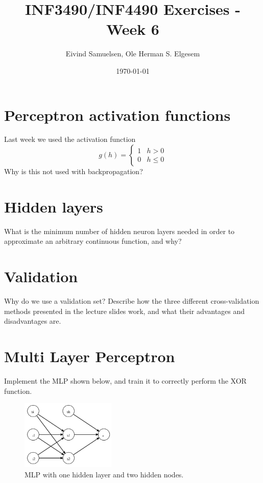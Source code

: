 \documentclass{article}           %
\title{\vspace{-2cm}INF3490/INF4490 Exercises - Week 6}
\author{Eivind Samuelsen, Ole Herman S. Elgesem}
\date{\today}
\newcommand\marginsymbol[1][0pt]{%
  \tabto*{0cm}\makebox[\dimexpr-1cm-#1\relax][r]{$\mathbb{P}$}\tabto*{\TabPrevPos}}
\begin{document}
    \renewcommand\marginsymbol[1][0pt]{%
  \tabto*{0cm}\makebox[-1cm][c]{$\mathbb{P}$}\tabto*{\TabPrevPos}}

\maketitle


\section{Perceptron activation functions}
Last week we used the activation function
\[
g(h) =
\begin{cases}
      1 & h > 0 \\
      0 & h \leq 0
   \end{cases}
\]
Why is this not used with backpropagation?

\section{Hidden layers}
What is the minimum number of hidden neuron layers needed in order to approximate an arbitrary continuous function, and why?

\section{Validation}
Why do we use a validation set?
Describe how the three different cross-validation methods presented in the lecture slides work, and what their advantages and disadvantages are.

\section{Multi Layer Perceptron}
Implement the MLP shown below, and train it to correctly perform the XOR function.

\begin{figure}[H]
\begin{center}
\includegraphics[width=0.4\textwidth]{mlp.png}
\caption{MLP with one hidden layer and two hidden nodes.}
\label{fig:mlp}
\end{center}
\end{figure}
\end{document}
